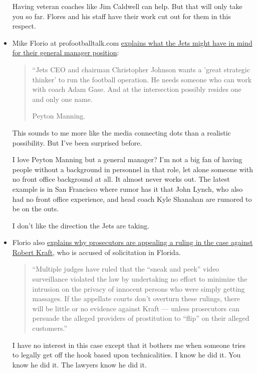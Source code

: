 \documentclass[11pt]{article}
\begin{document}
\begin{itemize}
Having veteran coaches like Jim Caldwell can help.  But that will only take you so far.  Flores and his staff have their work cut out for them in this respect.

\item Mike Florio at profootballtalk.com \href{https://profootballtalk.nbcsports.com/2019/05/17/rumors-fly-of-the-jets-pursuing-peyton-manning/}{explains what the Jets might have in mind for their general manager position}:

\begin{quote}
``Jets CEO and chairman Christopher Johnson wants a 'great strategic thinker' to run the football operation. He needs someone who can work with coach Adam Gase. And at the intersection possibly resides one and only one name.

Peyton Manning.
\end{quote}

This sounds to me more like the media connecting dots than a realistic possibility.  But I've been surprised before.

I love Peyton Manning but a general manager?  I'm not a big fan of having people without a background in personnel in that role, let alone someone with no front office background at all. It almost never works out.  The latest example is in San Francisco where rumor has it that John Lynch, who also had no front office experience, and head coach Kyle Shanahan are rumored to be on the outs.

I don’t like the direction the Jets are taking.

\item Florio also \href{https://profootballtalk.nbcsports.com/2019/05/17/prosecution-appeals-suppression-order-in-kraft-case/}{explains why prosecutors are appealing a ruling in the case against Robert Kraft}, who is accused of solicitation in Florida.

\begin{quote}
``Multiple judges have ruled that the “sneak and peek” video surveillance violated the law by undertaking no effort to minimize the intrusion on the privacy of innocent persons who were simply getting massages. If the appellate courts don’t overturn these rulings, there will be little or no evidence against Kraft — unless prosecutors can persuade the alleged providers of prostitution to “flip” on their alleged customers.''
\end{quote}

I have no interest in this case except that it bothers me when someone tries to legally get off the hook based upon technicalities.  I know he did it.  You know he did it.  The lawyers know he did it.


\end{itemize}
\end{document}
